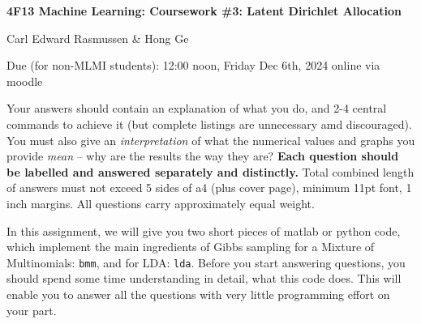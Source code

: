 \documentclass[12pt]{article}
\begin{document}
\centerline{\large\bf 4F13 Machine Learning: Coursework \#3: Latent
  Dirichlet Allocation}

\vspace{0.3cm}

\centerline{Carl Edward Rasmussen \& Hong Ge} 

\vspace{0.2cm}

\centerline{Due (for non-MLMI students): 12:00 noon, Friday Dec 6th, 2024 online via moodle}

\vspace{2mm}

Your answers should contain an explanation of what you do, and 2-4
central commands to achieve it (but complete listings are unnecessary
amd discouraged). You must also give an \emph{interpretation} of what
the numerical values and graphs you provide \emph{mean} -- why are the
results the way they are? {\bf Each question should be labelled and
  answered separately and distinctly.} Total combined length of
answers must not exceed 5 sides of a4 (plus cover page), minimum 11pt
font, 1 inch margins. All questions carry approximately equal weight.

In this assignment, we will give you two short pieces of matlab or python code,
which implement the main ingredients of Gibbs sampling for a Mixture
of Multinomials: \texttt{bmm}, and for LDA: \texttt{lda}. Before you
start answering questions, you should spend some time understanding in
detail, what this code does. This will enable you to answer all the
questions with very little programming effort on your part.
\end{document}
